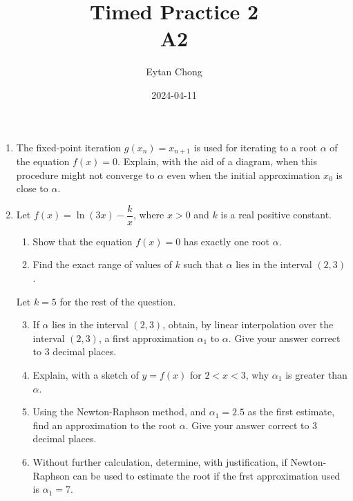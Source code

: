 \documentclass{jhwhw}
\title{Timed Practice 2\\A2}
\author{Eytan Chong}
\date{2024-04-11}
\begin{document}
    \problem{}
        \begin{enumerate}
            \item The fixed-point iteration $g(x_n) = x_{n+1}$ is used for iterating to a root $\alpha$ of the equation $f(x) = 0$. Explain, with the aid of a diagram, when this procedure might not converge to $\alpha$ even when the initial approximation $x_0$ is close to $\alpha$.
            \item Let $f(x) = \ln (3x) - \dfrac{k}{x}$, where $x > 0$ and $k$ is a real positive constant.
            \begin{enumerate}
                \item Show that the equation $f(x) = 0$ has exactly one root $\alpha$.
                \item Find the exact range of values of $k$ such that $\alpha$ lies in the interval $(2, 3)$.
            \end{enumerate}

            Let $k = 5$ for the rest of the question.

            \begin{enumerate}
                \setcounter{enumii}{2}
                \item If $\alpha$ lies in the interval $(2, 3)$, obtain, by linear interpolation over the interval $(2, 3)$, a first approximation $\alpha_1$ to $\alpha$. Give your answer correct to 3 decimal places.
                \item Explain, with a sketch of $y = f(x)$ for $2 < x < 3$, why $\alpha_1$ is greater than $\alpha$.
                \item Using the Newton-Raphson method, and $\alpha_1 = 2.5$ as the first estimate, find an approximation to the root $\alpha$. Give your answer correct to 3 decimal places.
                \item Without further calculation, determine, with justification, if Newton-Raphson can be used to estimate the root if the frst approximation used is $\alpha_1 = 7$.
            \end{enumerate}
        \end{enumerate}

    \solution
\end{document}
